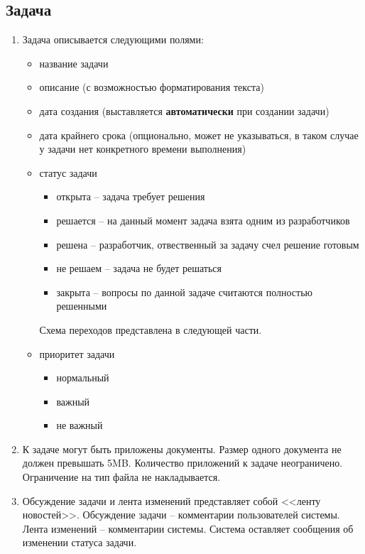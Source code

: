 \documentclass[14pt,a4paper]{extarticle}
\begin{document}
	\subsection {Задача}
	\begin{enumerate}
		\item Задача описывается следующими полями:
		\begin{itemize}
			\item название задачи
			
			\item описание (с возможностью форматирования текста)
			
			\item дата создания (выставляется {\bf автоматически} при создании задачи)
			
			\item дата крайнего срока (опционально, может не указываться, в таком случае у задачи нет конкретного времени выполнения)
			
			\item статус задачи
			\begin{itemize}
				\item открыта -- задача требует решения
				\item решается -- на данный момент задача взята одним из разработчиков
				\item решена -- разработчик, отвественный за задачу счел решение готовым
				\item не решаем -- задача не будет решаться
				\item закрыта -- вопросы по данной задаче считаются полностью решенными
			\end{itemize}
			Схема переходов представлена в следующей части.
			
			\item приоритет задачи
			\begin{itemize}
				\item нормальный
				\item важный
				\item не важный
			\end{itemize}
		\end{itemize}
		
		\item К задаче могут быть приложены документы. Размер одного документа не должен превышать 5MB. Количество приложений к задаче неограничено. Ограничение на тип файла не накладывается.
		
		\item Обсуждение задачи и лента изменений представляет собой <<ленту новостей>>. Обсуждение задачи -- комментарии пользователей системы. Лента изменений -- комментарии системы. Система оставляет сообщения об изменении статуса задачи.
	\end{enumerate}
		
\end{document}
